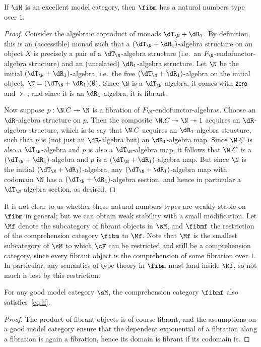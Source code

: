 \begin{thm}
  If $\sM$ is an excellent model category, then $\fibm$ has a natural numbers type over $1$.
\end{thm}
\begin{proof}
  Consider the algebraic coproduct of monads $\dT_\N+\dR_1$.
  By definition, this is an (accessible) monad such that a $(\dT_\N+\dR_1)$-algebra structure on an object $X$ is precisely a pair of a $\dT_\N$-algebra structure (i.e.\ an $F_\N$-endofunctor-algebra structure) and an (unrelated) $\dR_1$-algebra structure.
  Let $\N$ be the initial $(\dT_\N+\dR_1)$-algebra, i.e.\ the free $(\dT_\N+\dR_1)$-algebra on the initial object, $\N =(\dT_\N+\dR_1)(\emptyset)$.
  Since $\N$ is a $\dT_\N$-algebra, it comes with $\mathsf{zero}$ and $\succ$; and since it is an $\dR_1$-algebra, it is fibrant.

  Now suppose $p:\N.C\fib \N$ is a fibration of $F_\N$-endofunctor-algebras.
  Choose an $\dR$-algebra structure on $p$.
  Then the composite $\N.C\fib\N\fib 1$ acquires an $\dR$-algebra structure, which is to say that $\N.C$ acquires an $\dR_1$-algebra structure, such that $p$ is (not just an $\dR$-algebra but) an $\dR_1$-algebra map.
  Since $\N.C$ is also a $\dT_\N$-algebra and $p$ is also a $\dT_\N$-algebra map, it follows that $\N.C$ is a $(\dT_\N+\dR_1)$-algebra and $p$ is a $(\dT_\N+\dR_1)$-algebra map.
  But since $\N$ is the initial $(\dT_\N+\dR_1)$-algebra, any $(\dT_\N+\dR_1)$-algebra map with codomain $\N$ has a $(\dT_\N+\dR_1)$-algebra section, and hence in particular a $\dT_\N$-algebra section, as desired.
\end{proof}

It is not clear to us whether these natural numbers types are weakly stable on $\fibm$ in general; but we can obtain weak stability with a small modification.
Let $\Mf$ denote the subcategory of fibrant objects in $\sM$, and $\fibmf$ the restriction of the comprehension category $\fibm$ to $\Mf$.
Note that $\Mf$ is the smallest subcategory of $\sM$ to which $\cF$ can be restricted and still be a comprehension category, since every fibrant object is the comprehension of some fibration over $1$.
In particular, any semantics of type theory in $\fibm$ must land inside $\Mf$, so not much is lost by this restriction.

\begin{lem}
  For any good model category $\sM$, the comprehension category $\fibmf$ also satisfies~\eqref{eq:lf}.
\end{lem}
\begin{proof}
  The product of fibrant objects is of course fibrant, and the assumptions on a good model category ensure that the dependent exponential of a fibration along a fibration is again a fibration, hence its domain is fibrant if its codomain is.
\end{proof}

